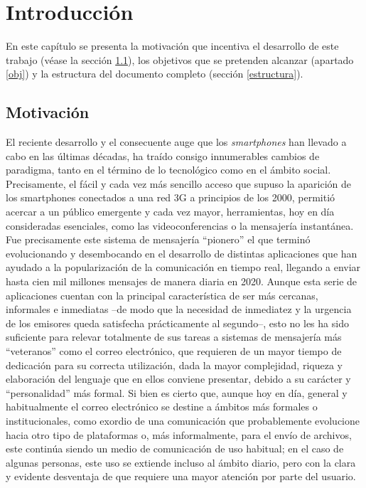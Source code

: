 \chapter{Introducción}
\label{cap:introduccion}



En este capítulo se presenta la motivación que incentiva el desarrollo de este trabajo (véase la sección \ref{motivacion}), los objetivos que se pretenden alcanzar (apartado \ref{obj}) y la estructura del documento completo (sección \ref{estructura}).

\section{Motivación}\label{motivacion}
El reciente desarrollo y el consecuente auge que los \textit{smartphones} han llevado a cabo en las últimas décadas, ha traído consigo innumerables cambios de paradigma, tanto en el término de lo tecnológico como en el ámbito social. Precisamente, el fácil y cada vez más sencillo acceso que supuso la aparición de los smartphones conectados a una red 3G a principios de los 2000, permitió acercar a un público emergente y cada vez mayor, herramientas, hoy en día consideradas esenciales, como las videoconferencias o la mensajería instantánea. Fue precisamente este sistema de mensajería ``pionero'' el que terminó evolucionando y desembocando en el desarrollo de distintas aplicaciones que han ayudado a la popularización de la comunicación en tiempo real, llegando a enviar hasta cien mil millones mensajes de manera diaria en 2020. Aunque esta serie de aplicaciones cuentan con la principal característica de ser más cercanas, informales e inmediatas –de modo que la necesidad de inmediatez y la urgencia de los emisores queda satisfecha prácticamente al segundo–, esto no les ha sido suficiente para relevar totalmente de sus tareas a sistemas de mensajería más ``veteranos'' como el correo electrónico, que requieren de un mayor tiempo de dedicación para su correcta utilización, dada la mayor complejidad, riqueza y elaboración del lenguaje que en ellos conviene presentar, debido a su carácter y ``personalidad'' más formal. Si bien es cierto que, aunque hoy en día, general y habitualmente el correo electrónico se destine a ámbitos más formales o institucionales, como exordio de una comunicación que probablemente evolucione hacia otro tipo de plataformas o, más informalmente, para el envío de archivos, este continúa siendo un medio de comunicación de uso habitual; en el caso de algunas personas, este uso se extiende incluso al ámbito diario, pero con la clara y evidente desventaja de que requiere una mayor atención por parte del usuario.


